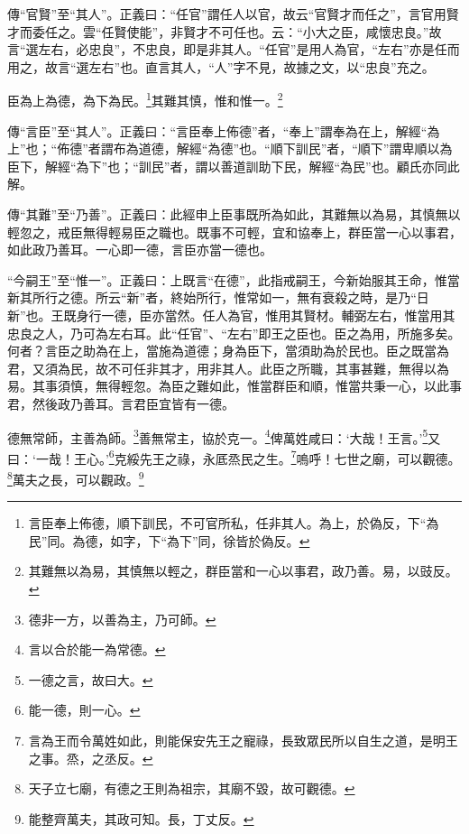 {\noindent\zhuan{}\fzbyks 傳“官賢”至“其人”。正義曰：“任官”謂任人以官，故云“官賢才而任之”，言官用賢才而委任之。雲“任賢使能”，非賢才不可任也。云：“小大之臣，咸懷忠良。”故言“選左右，必忠良”，不忠良，即是非其人。“任官”是用人為官，“左右”亦是任而用之，故言“選左右”也。直言其人，“人”字不見，故據之文，以“忠良”充之。 \par}

臣為上為德，為下為民。\footnote{言臣奉上佈德，順下訓民，不可官所私，任非其人。為上，於偽反，下“為民”同。為德，如字，下“為下”同，徐皆於偽反。}其難其慎，惟和惟一。\footnote{其難無以為易，其慎無以輕之，群臣當和一心以事君，政乃善。易，以豉反。}

{\noindent\zhuan{}\fzbyks 傳“言臣”至“其人”。正義曰：“言臣奉上佈德”者，“奉上”謂奉為在上，解經“為上”也；“佈德”者謂布為道德，解經“為德”也。“順下訓民”者，“順下”謂卑順以為臣下，解經“為下”也；“訓民”者，謂以善道訓助下民，解經“為民”也。顧氏亦同此解。 \par}

{\noindent\zhuan{}\fzbyks 傳“其難”至“乃善”。正義曰：此經申上臣事既所為如此，其難無以為易，其慎無以輕忽之，戒臣無得輕易臣之職也。既事不可輕，宜和協奉上，群臣當一心以事君，如此政乃善耳。一心即一德，言臣亦當一德也。 \par}

{\noindent\shu{}\fzkt “今嗣王”至“惟一”。正義曰：上既言“在德”，此指戒嗣王，今新始服其王命，惟當新其所行之德。所云“新”者，終始所行，惟常如一，無有衰殺之時，是乃“日新”也。王既身行一德，臣亦當然。任人為官，惟用其賢材。輔弼左右，惟當用其忠良之人，乃可為左右耳。此“任官”、“左右”即王之臣也。臣之為用，所施多矣。何者？言臣之助為在上，當施為道德；身為臣下，當須助為於民也。臣之既當為君，又須為民，故不可任非其才，用非其人。此臣之所職，其事甚難，無得以為易。其事須慎，無得輕忽。為臣之難如此，惟當群臣和順，惟當共秉一心，以此事君，然後政乃善耳。言君臣宜皆有一德。 \par}

德無常師，主善為師。\footnote{德非一方，以善為主，乃可師。}善無常主，協於克一。\footnote{言以合於能一為常德。}俾萬姓咸曰：‘大哉！王言。’\footnote{一德之言，故曰大。}又曰：‘一哉！王心。’\footnote{能一德，則一心。}克綏先王之祿，永厎烝民之生。\footnote{言為王而令萬姓如此，則能保安先王之寵祿，長致眾民所以自生之道，是明王之事。烝，之丞反。}嗚呼！七世之廟，可以觀德。\footnote{天子立七廟，有德之王則為祖宗，其廟不毀，故可觀德。}萬夫之長，可以觀政。\footnote{能整齊萬夫，其政可知。長，丁丈反。}


